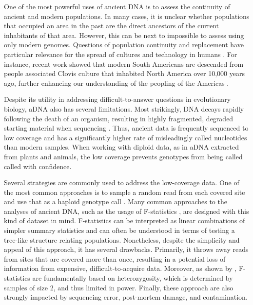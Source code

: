 \documentclass[11pt, oneside]{article}   	%
\begin{document}
One of the most powerful uses of ancient DNA is to assess the continuity of ancient and modern populations. In many cases, it is unclear whether populations that occupied an area in the past are the direct ancestors of the current inhabitants of that area. However, this can be next to impossible to assess using only modern genomes. Questions of population continuity and replacement have particular relevance for the spread of cultures and technology in humans \citep{lazaridis2016genomic}. For instance, recent work showed that modern South Americans are descended from people associated Clovis culture that inhabited North America over 10,000 years ago, further enhancing our understanding of the peopling of the Americas \citep{rasmussen2014genome}.

Despite its utility in addressing difficult-to-answer questions in evolutionary biology, aDNA also has several limitations. Most strikingly, DNA decays rapidly following the death of an organism, resulting in highly fragmented, degraded starting material when sequencing \citep{sawyer2012temporal}. Thus, ancient data is frequently sequenced to low coverage and has a significantly higher rate of misleadingly called nucleotides than modern samples. When working with diploid data, as in aDNA extracted from plants and animals, the low coverage prevents genotypes from being called called with confidence.

Several strategies are commonly used to address the low-coverage data. One of the most common approaches is to sample a random read from each covered site and use that as a haploid genotype call \citep{skoglund2012origins, haak2015massive, mathieson2015genome, allentoft2015population, fu2016genetic, lazaridis2016genomic}. Many common approaches to the analyses of ancient DNA, such as the usage of F-statistics \citep{green2010draft, patterson2012ancient}, are designed with this kind of dataset in mind. F-statistics can be interpreted as linear combinations of simpler summary statistics and can often be understood in terms of testing a tree-like structure relating populations. Nonetheless, despite the simplicity and appeal of this approach, it has several drawbacks. Primarily, it throws away reads from sites that are covered more than once, resulting in a potential loss of information from expensive, difficult-to-acquire data. Moreover, as shown by \citet{peter2016admixture}, F-statistics are fundamentally based on heterozygosity, which is determined by samples of size 2, and thus limited in power. Finally, these approach are also strongly impacted by sequencing error, post-mortem damage, and contamination.
\end{document}
